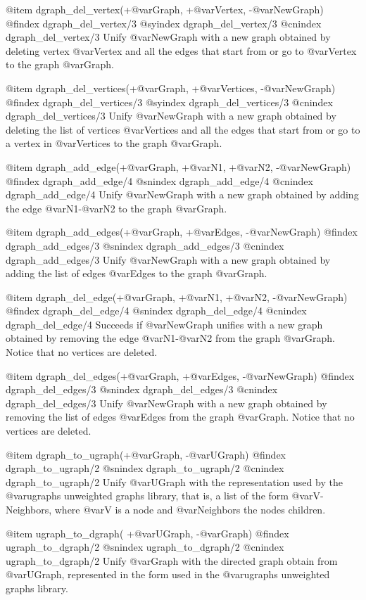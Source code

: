 {{{{{{{{{@item dgraph_del_vertex(+@var{Graph}, +@var{Vertex}, -@var{NewGraph})
@findex  dgraph_del_vertex/3
@syindex dgraph_del_vertex/3
@cnindex dgraph_del_vertex/3
Unify @var{NewGraph} with a new graph obtained by deleting vertex
@var{Vertex} and all the edges that start from or go to @var{Vertex} to
the graph @var{Graph}.

@item dgraph_del_vertices(+@var{Graph}, +@var{Vertices}, -@var{NewGraph})
@findex  dgraph_del_vertices/3
@syindex dgraph_del_vertices/3
@cnindex dgraph_del_vertices/3
Unify @var{NewGraph} with a new graph obtained by deleting the list of
vertices @var{Vertices} and all the edges that start from or go to a
vertex in @var{Vertices} to the graph @var{Graph}.

@item dgraph_add_edge(+@var{Graph}, +@var{N1}, +@var{N2}, -@var{NewGraph})
@findex  dgraph_add_edge/4
@snindex dgraph_add_edge/4
@cnindex dgraph_add_edge/4
Unify @var{NewGraph} with a new graph obtained by adding the edge
@var{N1}-@var{N2} to the graph @var{Graph}.

@item dgraph_add_edges(+@var{Graph}, +@var{Edges}, -@var{NewGraph})
@findex  dgraph_add_edges/3
@snindex dgraph_add_edges/3
@cnindex dgraph_add_edges/3
Unify @var{NewGraph} with a new graph obtained by adding the list of
edges @var{Edges} to the graph @var{Graph}.

@item dgraph_del_edge(+@var{Graph}, +@var{N1}, +@var{N2}, -@var{NewGraph})
@findex  dgraph_del_edge/4
@snindex dgraph_del_edge/4
@cnindex dgraph_del_edge/4
Succeeds if @var{NewGraph} unifies with a new graph obtained by
removing the edge @var{N1}-@var{N2} from the graph @var{Graph}. Notice
that no vertices are deleted.

@item dgraph_del_edges(+@var{Graph}, +@var{Edges}, -@var{NewGraph})
@findex  dgraph_del_edges/3
@snindex dgraph_del_edges/3
@cnindex dgraph_del_edges/3
Unify @var{NewGraph} with a new graph obtained by removing the list of
edges @var{Edges} from the graph @var{Graph}. Notice that no vertices
are deleted.

@item dgraph_to_ugraph(+@var{Graph}, -@var{UGraph})
@findex  dgraph_to_ugraph/2
@snindex dgraph_to_ugraph/2
@cnindex dgraph_to_ugraph/2
Unify @var{UGraph} with the representation used by the @var{ugraphs}
unweighted graphs library, that is, a list of the form
@var{V-Neighbors}, where @var{V} is a node and @var{Neighbors} the nodes
children.

@item ugraph_to_dgraph( +@var{UGraph}, -@var{Graph})
@findex  ugraph_to_dgraph/2
@snindex ugraph_to_dgraph/2
@cnindex ugraph_to_dgraph/2
Unify @var{Graph} with the directed graph obtain from @var{UGraph},
represented in the form used in the @var{ugraphs} unweighted graphs
library.

}}}}}}}}}

